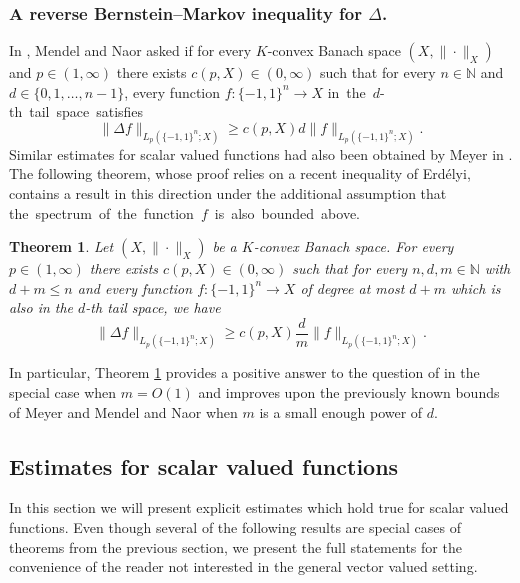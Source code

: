 \documentclass[11pt,reqno]{amsart}
\renewcommand{\leq}{\leqslant}
\renewcommand{\geq}{\geqslant}
\newcommand{\1}{\mathbf 1}
\newtheorem{theorem}{Theorem}
\theoremstyle{remark}
\newcommand{\N}{\mathbb N}
\begin{document}
\subsubsection{A reverse Bernstein--Markov inequality for $\Delta$.} In \cite{MN14}, Mendel and Naor asked if for every $K$-convex Banach space $(X,\|\cdot\|_X)$ and $p\in(1,\infty)$ there exists $c(p,X)\in(0,\infty)$ such that for every $n\in\N$ and $d\in\{0,1,\ldots,n-1\}$, every function $f:\{-1,1\}^n\to X$ \mbox{in the $d$-th tail space satisfies}
\begin{equation}
\|\Delta f\|_{L_p(\{-1,1\}^n;X)} \geq c(p,X) d \|f\|_{L_p(\{-1,1\}^n;X)}.
\end{equation}
Similar estimates for scalar valued functions had also been obtained by Meyer in \cite{Mey84}. The following theorem, whose proof relies on a recent inequality of Erd\'elyi, contains a result in this direction under the additional assumption that \mbox{the spectrum of the function $f$ is also bounded above.}

\begin{theorem} \label{thm:reversebernsteinKconvex}
Let $(X,\|\cdot\|_X)$ be a $K$-convex Banach space. For every $p\in(1,\infty)$ there exists $c(p,X)\in(0,\infty)$ such that for every $n,d,m\in\N$ with $d+m\leq n$ and every function $f:\{-1,1\}^n\to X$ of degree at most $d+m$ which is also in the $d$-th tail space, we have
\begin{equation} \label{eq:reverseLaplacian}
\|\Delta f\|_{L_p(\{-1,1\}^n;X)} \geq c(p,X) \frac{d}{m} \|f\|_{L_p(\{-1,1\}^n;X)}.
\end{equation}
\end{theorem}

In particular, Theorem \ref{thm:reversebernsteinKconvex} provides a positive answer to the question of \cite{MN14} in the special case when $m=O(1)$ and improves upon the previously known bounds of Meyer \cite{Mey84} and Mendel and Naor \cite{MN14} when $m$ is a small enough power of $d$.


\subsection{Estimates for scalar valued functions} \label{subsec:1.3} In this section we will present explicit estimates which hold true for scalar valued functions. Even though several of the following results are special cases of theorems from the previous section, we present the full statements for the convenience of the reader not interested in the general vector valued setting. 
\end{document}
